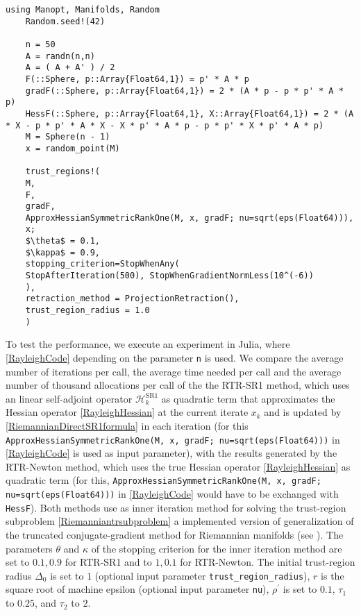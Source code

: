 \newpage

\begin{lstlisting}[mathescape, caption={The Rayleigh quotient minimization experiment in Julia for $n = 500$.}, label={RayleighCode}]
    using Manopt, Manifolds, Random
    Random.seed!(42)

    n = 50
    A = randn(n,n)
    A = ( A + A' ) / 2
    F(::Sphere, p::Array{Float64,1}) = p' * A * p
    gradF(::Sphere, p::Array{Float64,1}) = 2 * (A * p - p * p' * A * p)
    HessF(::Sphere, p::Array{Float64,1}, X::Array{Float64,1}) = 2 * (A * X - p * p' * A * X - X * p' * A * p - p * p' * X * p' * A * p)
    M = Sphere(n - 1)
    x = random_point(M)

    trust_regions!(
    M,
    F,
    gradF,
    ApproxHessianSymmetricRankOne(M, x, gradF; nu=sqrt(eps(Float64))),
    x;
    $\theta$ = 0.1,
    $\kappa$ = 0.9,
    stopping_criterion=StopWhenAny(
    StopAfterIteration(500), StopWhenGradientNormLess(10^(-6))
    ),
    retraction_method = ProjectionRetraction(),
    trust_region_radius = 1.0
    )
\end{lstlisting}
To test the performance, we execute an experiment in Julia, where \cref{RayleighCode} depending on the parameter \lstinline!n! is used. We compare the average number of iterations per call, the average time needed per call and the average number of thousand allocations per call of the the RTR-SR1 method, which uses an linear self-adjoint operator $\mathcal{H}^{\mathrm{SR1}}_k$ as quadratic term that approximates the Hessian operator \cref{RayleighHessian} at the current iterate $x_k$ and is updated by \cref{RiemannianDirectSR1formula} in each iteration (for this \lstinline!ApproxHessianSymmetricRankOne(M, x, gradF; nu=sqrt(eps(Float64)))! in \cref{RayleighCode} is used as input parameter), with the results generated by the RTR-Newton method, which uses the true Hessian operator \cref{RayleighHessian} as quadratic term (for this, \lstinline!ApproxHessianSymmetricRankOne(M, x, gradF; nu=sqrt(eps(Float64)))! in \cref{RayleighCode} would have to be exchanged with \lstinline!HessF!). Both methods use as inner iteration method for solving the trust-region subproblem \cref{Riemanniantrsubproblem} a implemented version of generalization of the truncated conjugate-gradient method for Riemannian manifolds (see \cite[Algorithm~11]{AbsilMahonySepulchre:2008}). The parameters $\theta$ and $\kappa$ of the stopping criterion \cite[(7.10)]{AbsilMahonySepulchre:2008} for the inner iteration method are set to $0.1, 0.9$ for RTR-SR1 and to $1, 0.1$ for RTR-Newton. The initial trust-region radius $\Delta_0$ is set to $1$ (optional input parameter \lstinline!trust_region_radius!), $r$ is the square root of machine epsilon (optional input parameter \lstinline!nu!), $\rho^{\prime}$ is set to $0.1$, $\tau_1$ to $0.25$, and $\tau_2$ to $2$. \\
